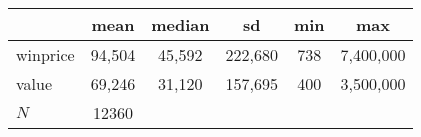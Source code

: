 {
\def\sym#1{\ifmmode^{#1}\else\(^{#1}\)\fi}
\begin{tabular}{l*{1}{ccccc}}
\hline\hline
            &        mean&      median&          sd&         min&         max\\
\hline
winprice    &      94,504&      45,592&     222,680&         738&   7,400,000\\
value       &      69,246&      31,120&     157,695&         400&   3,500,000\\
\hline
\(N\)       &       12360&            &            &            &            \\
\hline\hline
\end{tabular}
}
